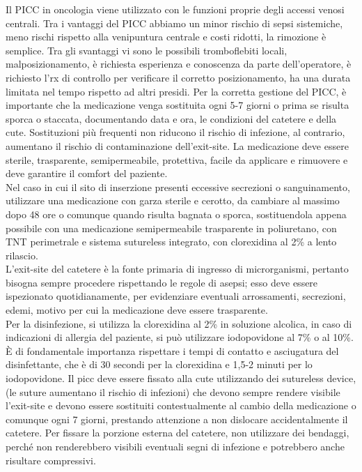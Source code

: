 Il PICC in oncologia viene utilizzato con le funzioni proprie degli accessi venosi centrali. 
Tra i vantaggi del PICC abbiamo un minor rischio di sepsi sistemiche, meno rischi rispetto alla venipuntura 
centrale e costi ridotti, la rimozione è semplice. Tra gli svantaggi vi sono le possibili tromboflebiti locali, 
malposizionamento, è richiesta esperienza e conoscenza da parte dell’operatore, è richiesto l’rx di controllo per 
verificare il corretto posizionamento, ha una durata limitata nel tempo rispetto ad altri presidi\cite{LINEEGUIDA}. 
Per la corretta gestione del PICC, è importante che la medicazione venga sostituita ogni 5-7 giorni o prima se risulta
sporca o staccata, documentando data e ora, le condizioni del catetere e della cute. Sostituzioni più frequenti non 
riducono il rischio di infezione, al contrario, aumentano il rischio di contaminazione dell’exit-site. La medicazione 
deve essere sterile, trasparente, semipermeabile, protettiva, facile da applicare e rimuovere e deve garantire 
il comfort del paziente\cite{AIOMCVC}.\\

Nel caso in cui il sito di inserzione presenti eccessive secrezioni o sanguinamento, utilizzare una medicazione con 
garza sterile e cerotto, da cambiare al massimo dopo 48 ore o comunque quando risulta bagnata o sporca, sostituendola 
appena possibile con una medicazione semipermeabile trasparente in poliuretano, con TNT perimetrale e sistema 
sutureless integrato, con clorexidina al 2\% a lento rilascio.\\ 
L’exit-site del catetere è la fonte primaria di ingresso di microrganismi, pertanto bisogna sempre procedere 
rispettando le regole di asepsi; esso deve essere ispezionato quotidianamente, per evidenziare eventuali arrossamenti, 
secrezioni, edemi, motivo per cui la medicazione deve essere trasparente\cite{AIOMCVC}.\\
Per la disinfezione, si utilizza la clorexidina al 2\% in soluzione alcolica, in caso di indicazioni di allergia del 
paziente, si può utilizzare iodopovidone al 7\% o al 10\%. È di fondamentale importanza rispettare i tempi di
contatto e asciugatura del disinfettante, che è di 30 secondi per la clorexidina e 1,5-2 minuti per lo iodopovidone.
Il picc deve essere fissato alla cute utilizzando dei sutureless device, (le suture aumentano il rischio di infezioni) 
che devono sempre rendere visibile l’exit-site e devono essere sostituiti contestualmente al cambio della medicazione 
o comunque ogni 7 giorni, prestando attenzione a non dislocare accidentalmente il catetere. 
Per fissare la porzione esterna del catetere, non utilizzare dei bendaggi, perché non renderebbero visibili eventuali 
segni di infezione e potrebbero anche risultare compressivi\cite{AIOMCVC}.\\

